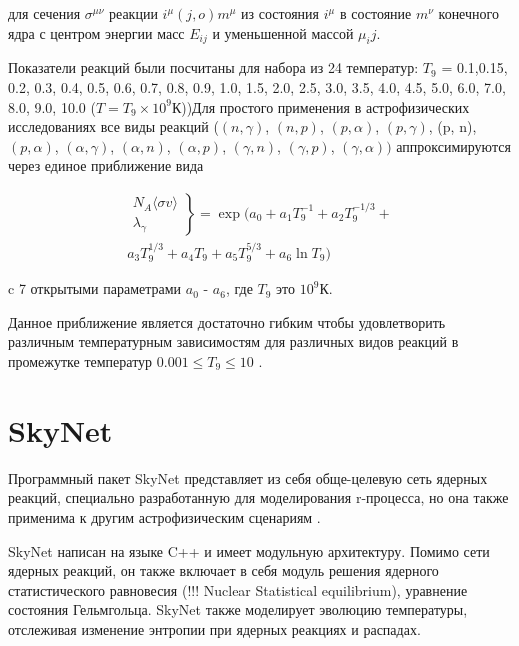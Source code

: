 \documentclass[%
master,    %
natbib,      %
subf,        %
href,        %
colorlinks,  %
]{disser}
\begin{document}
для сечения $\sigma^{\mu\nu}$ реакции $i^\mu(j,o)m^\mu$ из состояния $i^\mu$ в состояние $m^\nu$ конечного ядра с центром энергии масс $E_{ij}$ и уменьшенной массой $\mu_ij$.

Показатели реакций были посчитаны для набора из 24 температур: $T_9$ = 0.1,0.15, 0.2, 0.3, 0.4, 0.5, 0.6, 0.7, 0.8, 0.9, 1.0, 1.5, 2.0, 2.5, 3.0, 3.5, 4.0, 4.5, 5.0, 6.0, 7.0, 8.0, 9.0, 10.0 ($T = T_9 \times 10^{9}\text{К}$))Для простого применения в астрофизических исследованиях все виды реакций ($(n,\gamma)$, $(n,p)$, $(p,\alpha)$, $(p, \gamma)$, (p, n), $(p, \alpha)$, $(\alpha, \gamma)$, $(\alpha, n)$, $(\alpha, p)$, $(\gamma, n)$, $(\gamma, p)$, $(\gamma, \alpha))$ аппроксимируются через единое приближение вида

\begin{equation}
\label{eq:system}
\begin{split}
\left.
	\begin{array}{ccc}
		N_{A}\langle \sigma v \rangle \\
		\lambda_\gamma
	\end{array}
\right\}
 = \exp (a_0 + a_1 T_9^{-1} + a_2 T_9^{-1/3} + \\
a_3 T_9^{1/3} + a_4 T_9 + a_5 T_9^{5/3} + a_6 \ln T_9)
\end{split}
\end{equation}

c 7 открытыми параметрами $a_0$ - $a_6$, где $T_9$ это $10^9$К.

Данное приближение является достаточно гибким чтобы удовлетворить различным температурным зависимостям для различных видов реакций в промежутке температур $0.001 \le T_9 \le 10$ \cite{rates}.

\section{SkyNet}

Программный пакет SkyNet представляет из себя обще-целевую сеть ядерных реакций, специально разработанную для моделирования r-процесса, но она также применима к другим астрофизическим сценариям \cite{skynet}.

SkyNet написан на языке C++ и имеет модульную архитектуру. Помимо сети ядерных реакций, он также включает в себя модуль решения ядерного статистического равновесия (!!! Nuclear Statistical equilibrium), уравнение состояния Гельмгольца. SkyNet также моделирует эволюцию температуры, отслеживая изменение энтропии при ядерных реакциях и распадах.
\end{document}
